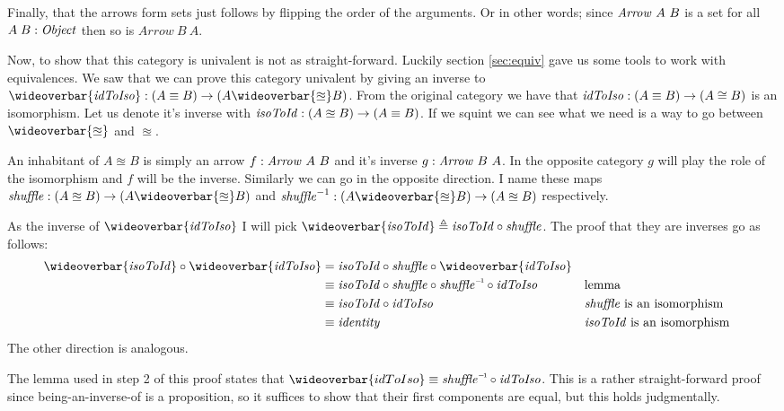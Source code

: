 Finally, that the arrows form sets just follows by flipping the order of the
arguments. Or in other words; since $\mathit{Arrow}\ A\ B$ is a set for all $A\;B \mathrel{:}
\mathit{Object}$ then so is $Arrow\ B\ A$.

Now, to show that this category is univalent is not as straight-forward. Luckily
section \ref{sec:equiv} gave us some tools to work with equivalences. We saw
that we can prove this category univalent by giving an inverse to
$\wideoverbar{\idToIso} \tp (A \equiv B) \to (A \wideoverbar{\approxeq} B)$.
From the original category we have that $\mathit{idToIso} \mathrel{:} (A \equiv B) \to (A \cong
B)$ is an isomorphism. Let us denote it's inverse with $\mathit{isoToId} \mathrel{:} (A
\approxeq B) \to (A \equiv B)$. If we squint we can see what we need is a way to
go between $\wideoverbar{\approxeq}$ and $\approxeq$.

An inhabitant of $A \approxeq B$ is simply an arrow $f \mathrel{:} \mathit{Arrow}\ A\ B$
and it's inverse $g \mathrel{:} \mathit{Arrow}\ B\ A$. In the opposite category $g$ will
play the role of the isomorphism and $f$ will be the inverse. Similarly we can
go in the opposite direction. I name these maps $\var{shuffle} \tp (A \approxeq
B) \to (A \wideoverbar{\approxeq} B)$ and $\var{shuffle}^{-1} \tp (A
\wideoverbar{\approxeq} B) \to (A \approxeq B)$ respectively.

As the inverse of $\wideoverbar{\idToIso}$ I will pick $\wideoverbar{\isoToId}
\defeq \isoToId \comp \var{shuffle}$. The proof that they are inverses go as
follows:
%
\begin{align*}
\wideoverbar{\isoToId} \comp \wideoverbar{\idToIso} & =
\isoToId \comp \var{shuffle} \comp \wideoverbar{\idToIso}
\\
%
& \equiv
\isoToId \comp \var{shuffle} \comp \inv{\var{shuffle}} \comp \idToIso
&& \text{lemma} \\
& \equiv
\isoToId \comp \idToIso
&& \text{$\var{shuffle}$ is an isomorphism} \\
& \equiv
\identity
&& \text{$\isoToId$ is an isomorphism}
\end{align*}
%
The other direction is analogous.

The lemma used in step 2 of this proof states that $\wideoverbar{idToIso} \equiv
\inv{\var{shuffle}} \comp \idToIso$. This is a rather straight-forward proof
since being-an-inverse-of is a proposition, so it suffices to show that their
first components are equal, but this holds judgmentally.

